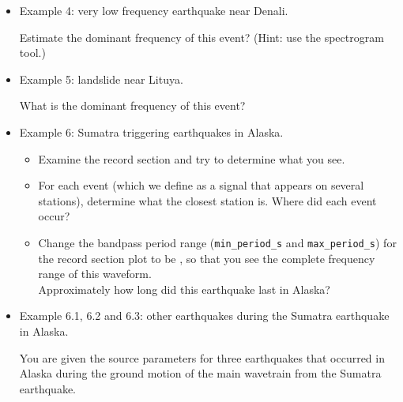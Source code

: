 \documentclass[11pt,titlepage,fleqn]{article}
\begin{document}
\begin{enumerate}
\begin{itemize}
\item Example 4: very low frequency earthquake near Denali. 

Estimate the dominant frequency of this event? (Hint: use the spectrogram tool.)

\item Example 5: landslide near Lituya. 

What is the dominant frequency of this event?

\item Example 6: Sumatra  triggering earthquakes in Alaska. 
%
\begin{itemize}
\item Examine the record section and try to determine what you see.
\item For each event (which we define as a signal that appears on several stations), determine what the closest station is. Where did each event occur?
\item Change the bandpass period range (\verb+min_period_s+ and \verb+max_period_s+) for the record section plot to be , so that you see the complete frequency range of this waveform. \\
Approximately how long did this earthquake last in Alaska?
\end{itemize}

\item Example 6.1, 6.2 and 6.3: other earthquakes during the Sumatra  earthquake in Alaska.

You are given the source parameters for three earthquakes that occurred in Alaska during the ground motion of the main wavetrain from the Sumatra  earthquake.


\end{itemize}
\end{enumerate}
\end{document}

